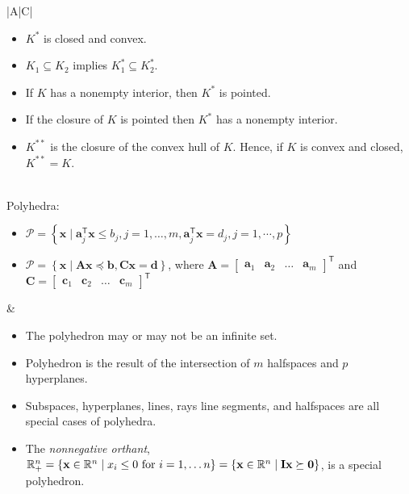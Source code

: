 \documentclass{article}
\newcommand{\trans}{\mathsf{T}}
\begin{document}
\begin{table}[ht!]
\begin{tabularx}{\textwidth}{|A|C|}
\begin{itemize}[leftmargin=*]
\begin{itemize}[label={$\triangleright$}]
        \item \(K^*\) is closed and convex.
        \item \(K_1 \subseteq K_2\) implies \(K_1^* \subseteq K_2^*\).
        \item If \(K\) has a nonempty interior, then \(K^*\) is pointed.
        \item If the closure of \(K\) is pointed then \(K^*\) has a nonempty interior.
        \item \(K^{**}\) is the closure of the convex hull of \(K\). Hence, if \(K\) is convex and closed, \(K^{**}=K\).
    \end{itemize}
\end{itemize} \\
\hline
Polyhedra:
\begin{itemize}[leftmargin=*]
    \item $\mathcal{P} = \left\{ \mathbf{x} \mid \mathbf{a}_j^\trans \mathbf{x} \leq b_j, j=1, \dots, m, \mathbf{a}_j^\trans \mathbf{x} = d_j, j=1,\cdots, p  \right\}$
    \item \(\mathcal{P} = \left\{ \mathbf{x} \mid \mathbf{Ax} \preceq \mathbf{b}, \mathbf{Cx} = \mathbf{d} \right\}\), where \(\mathbf{A} = \begin{bmatrix}
            \mathbf{a}_1 & \mathbf{a}_2 & \dots & \mathbf{a}_m
        \end{bmatrix}^\trans\) and \(\mathbf{C} = \begin{bmatrix}
            \mathbf{c}_1 & \mathbf{c}_2 & \dots & \mathbf{c}_m
        \end{bmatrix}^\trans\)
\end{itemize} & \vspace{-3.5ex}
\begin{itemize}[leftmargin=*]
    \item The polyhedron may or may not be an infinite set.
    \item Polyhedron is the result of the intersection of \(m\) halfspaces and \(p\) hyperplanes.
    \item Subspaces, hyperplanes, lines, rays line segments, and halfspaces are all special cases of polyhedra.
    \item The \emph{nonnegative orthant}, \(\mathbb{R}_{+}^{n} = \left\{ \mathbf{x} \in \mathbb{R}^n \mid x_i \leq 0 \textnormal{ for } i=1,\dots n \right\} = \left\{ \mathbf{x} \in \mathbb{R}^n \mid \mathbf{Ix}  \succeq \mathbf{0}\right\}\), is a special polyhedron.
\end{itemize}\\

\end{tabularx}
\end{table}
\end{document}
